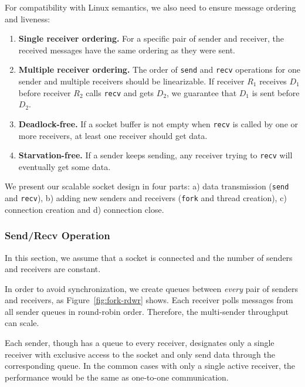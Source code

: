 For compatibility with Linux semantics, we also need to ensure message ordering and liveness:
\begin{enumerate}
\item \textbf{Single receiver ordering.} For a specific pair of sender and receiver, the received messages have the same ordering as they were sent.
\item \textbf{Multiple receiver ordering.} The order of \texttt{send} and \texttt{recv} operations for one sender and multiple receivers should be linearizable. If receiver $R_1$ receives $D_1$ before receiver $R_2$ calls \texttt{recv} and gets $D_2$, we guarantee that $D_1$ is sent before $D_2$.
\item \textbf{Deadlock-free.} If a socket buffer is not empty when \texttt{recv} is called by one or more receivers, at least one receiver should get data.
\item \textbf{Starvation-free.} If a sender keeps sending, any receiver trying to \texttt{recv} will eventually get some data.
\end{enumerate}

We present our scalable socket design in four parts: a) data transmission (\texttt{send} and \texttt{recv}), b) adding new senders and receivers (\texttt{fork} and thread creation), c) connection creation and d) connection close.

\subsubsection{Send/Recv Operation}
\label{subsubsec:fork_rdwr}

In this section, we assume that a socket is connected and the number of senders and receivers are constant.

In order to avoid synchronization, we create queues between \emph{every} pair of senders and receivers, as Figure~\ref{fig:fork-rdwr} shows. %
Each receiver polls messages from all sender queues in round-robin order. Therefore, the multi-sender throughput can scale.

Each sender, though has a queue to every receiver, designates only a single receiver with exclusive access to the socket and only send data through the corresponding queue. 
In the common cases with only a single active receiver, the performance would be the same as one-to-one communication. 

